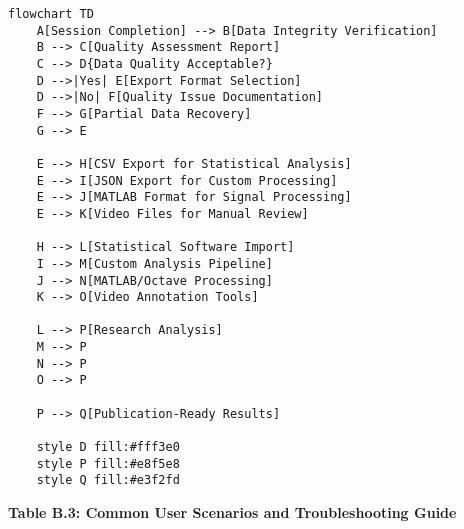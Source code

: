 \documentclass[12pt,a4paper]{article}
\begin{document}
\begin{verbatim}
flowchart TD
    A[Session Completion] --> B[Data Integrity Verification]
    B --> C[Quality Assessment Report]
    C --> D{Data Quality Acceptable?}
    D -->|Yes| E[Export Format Selection]
    D -->|No| F[Quality Issue Documentation]
    F --> G[Partial Data Recovery]
    G --> E
    
    E --> H[CSV Export for Statistical Analysis]
    E --> I[JSON Export for Custom Processing]
    E --> J[MATLAB Format for Signal Processing]
    E --> K[Video Files for Manual Review]
    
    H --> L[Statistical Software Import]
    I --> M[Custom Analysis Pipeline]
    J --> N[MATLAB/Octave Processing]
    K --> O[Video Annotation Tools]
    
    L --> P[Research Analysis]
    M --> P
    N --> P
    O --> P
    
    P --> Q[Publication-Ready Results]
    
    style D fill:#fff3e0
    style P fill:#e8f5e8
    style Q fill:#e3f2fd
\end{verbatim}

\textbf{Table B.3: Common User Scenarios and Troubleshooting Guide}
\end{document}
